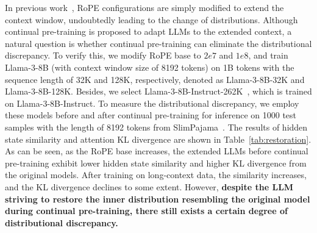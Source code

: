 In previous work~\citep{chen-arxiv-2023-extending, ding-icml-2024-longrope}, RoPE configurations are simply modified to extend the context window, undoubtedly leading to the change of distributions. Although continual pre-training is proposed to adapt LLMs to the extended context, a natural question is whether continual pre-training can eliminate the distributional discrepancy. To verify this, we modify 
RoPE base to $2e7$ and $1e8$, and train Llama-3-8B (with context window size of 8192 tokens) on 1B tokens with the sequence length of 32K and 128K, respectively, denoted as Llama-3-8B-32K and Llama-3-8B-128K.  Besides, we select Llama-3-8B-Instruct-262K~\cite{gradient-hf-2024-longcontextllama3}, which is trained on Llama-3-8B-Instruct. 
To measure the distributional discrepancy, we employ these models before and after continual pre-training for inference on 1000 test samples with the length of 8192 tokens from SlimPajama~\cite{soboleva-huggingface-2023-slimpajama}. The results of hidden state similarity and attention KL divergence are shown in Table~\ref{tab:restoration}. As can be seen, as the 
RoPE base increases, the extended LLMs before continual pre-training exhibit lower hidden state similarity and higher KL divergence from the original models. After training on long-context data, the similarity increases, and the KL divergence declines to some extent. However, \textbf{despite the LLM striving to restore the inner distribution resembling the original model during continual pre-training, there still exists a certain degree of distributional discrepancy.}





\begin{table}[htb]
    \centering
        \caption{Results of hidden state similarity and KL divergence before and after continual pre-training.}
    \label{tab:restoration}
\end{table}



